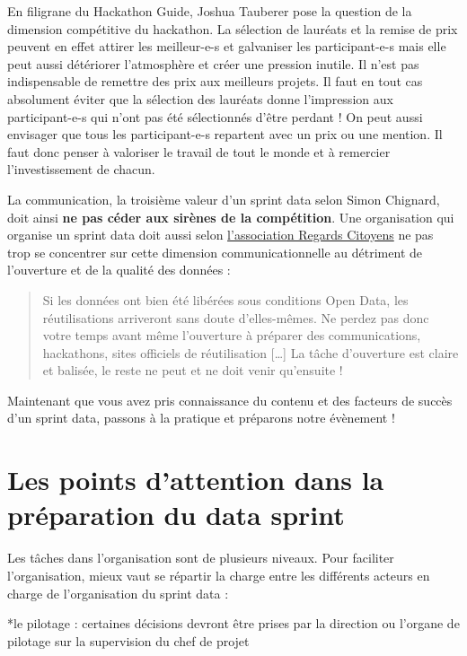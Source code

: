 \documentclass[]{book}
\begin{document}
En filigrane du Hackathon Guide, Joshua Tauberer pose la question de la
dimension compétitive du hackathon. La sélection de lauréats et la
remise de prix peuvent en effet attirer les meilleur-e-s et galvaniser
les participant-e-s mais elle peut aussi détériorer l'atmosphère et
créer une pression inutile. Il n'est pas indispensable de remettre des
prix aux meilleurs projets. Il faut en tout cas absolument éviter que la
sélection des lauréats donne l'impression aux participant-e-s qui n'ont
pas été sélectionnés d'être perdant ! On peut aussi envisager que tous
les participant-e-s repartent avec un prix ou une mention. Il faut donc
penser à valoriser le travail de tout le monde et à remercier
l'investissement de chacun.

La communication, la troisième valeur d'un sprint data selon Simon
Chignard, doit ainsi \textbf{ne pas céder aux sirènes de la
compétition}. Une organisation qui organise un sprint data doit aussi
selon
\href{https://www.regardscitoyens.org/apprenons-des-echecs-de-la-dila-episode-1-comment-faire-de-lopen-data/}{l'association
Regards Citoyens} ne pas trop se concentrer sur cette dimension
communicationnelle au détriment de l'ouverture et de la qualité des
données :

\begin{quote}
Si les données ont bien été libérées sous conditions Open Data, les
réutilisations arriveront sans doute d'elles-mêmes. Ne perdez pas donc
votre temps avant même l'ouverture à préparer des communications,
hackathons, sites officiels de réutilisation {[}\ldots{}{]} La tâche
d'ouverture est claire et balisée, le reste ne peut et ne doit venir
qu'ensuite !
\end{quote}

Maintenant que vous avez pris connaissance du contenu et des facteurs de
succès d'un sprint data, passons à la pratique et préparons notre
évènement !

\chapter{Les points d'attention dans la préparation du data
sprint}\label{preparation}

Les tâches dans l'organisation sont de plusieurs niveaux. Pour faciliter
l'organisation, mieux vaut se répartir la charge entre les différents
acteurs en charge de l'organisation du sprint data :

*le pilotage : certaines décisions devront être prises par la direction
ou l'organe de pilotage sur la supervision du chef de projet
\end{document}
